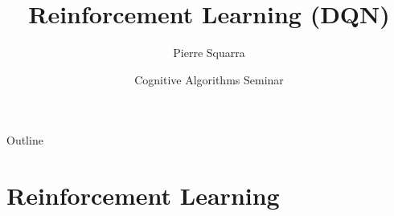 \documentclass[xcolor=dvipsnames]{beamer}
\title{Reinforcement Learning (DQN)}
\author{Pierre Squarra}
\date{Cognitive Algorithms Seminar}
\begin{document}
{
\begin{frame}
  \titlepage
\end{frame}
}

\begin{frame}{Outline}
\tableofcontents
\end{frame}

\section{Reinforcement Learning}

\end{document}
